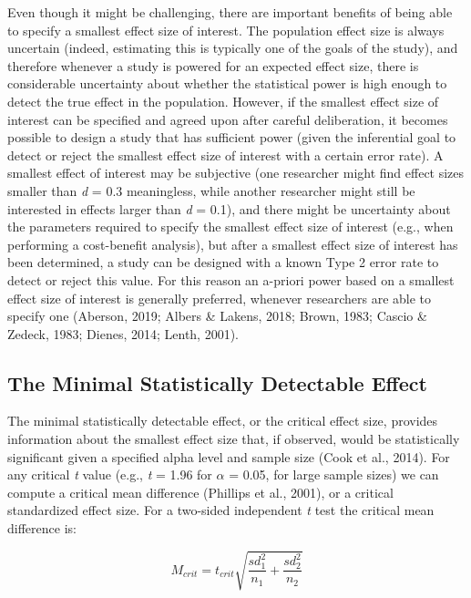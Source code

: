 \documentclass[
  english,
  ,jou,floatsintext]{apa6}
\begin{document}
Even though it might be challenging, there are important benefits of being able to specify a smallest effect size of interest. The population effect size is always uncertain (indeed, estimating this is typically one of the goals of the study), and therefore whenever a study is powered for an expected effect size, there is considerable uncertainty about whether the statistical power is high enough to detect the true effect in the population. However, if the smallest effect size of interest can be specified and agreed upon after careful deliberation, it becomes possible to design a study that has sufficient power (given the inferential goal to detect or reject the smallest effect size of interest with a certain error rate). A smallest effect of interest may be subjective (one researcher might find effect sizes smaller than \emph{d} = 0.3 meaningless, while another researcher might still be interested in effects larger than \emph{d} = 0.1), and there might be uncertainty about the parameters required to specify the smallest effect size of interest (e.g., when performing a cost-benefit analysis), but after a smallest effect size of interest has been determined, a study can be designed with a known Type 2 error rate to detect or reject this value. For this reason an a-priori power based on a smallest effect size of interest is generally preferred, whenever researchers are able to specify one (Aberson, 2019; Albers \& Lakens, 2018; Brown, 1983; Cascio \& Zedeck, 1983; Dienes, 2014; Lenth, 2001).

\hypertarget{the-minimal-statistically-detectable-effect}{%
\subsection{The Minimal Statistically Detectable Effect}\label{the-minimal-statistically-detectable-effect}}

The minimal statistically detectable effect, or the critical effect size, provides information about the smallest effect size that, if observed, would be statistically significant given a specified alpha level and sample size (Cook et al., 2014). For any critical \emph{t} value (e.g., \emph{t} = 1.96 for \(\alpha\) = 0.05, for large sample sizes) we can compute a critical mean difference (Phillips et al., 2001), or a critical standardized effect size. For a two-sided independent \emph{t} test the critical mean difference is:

\[M_{crit} = t_{crit}{\sqrt{\frac{sd_1^2}{n_1} + \frac{sd_2^2}{n_2}}}\]
\end{document}
